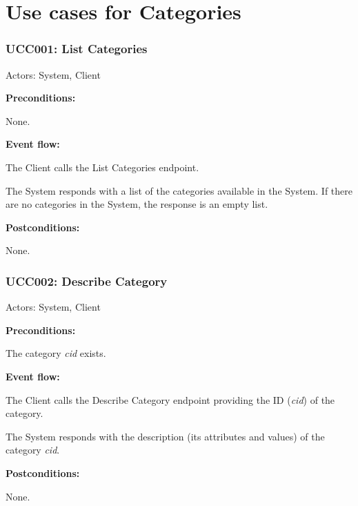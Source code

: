 \section{Use cases for Categories}

\begin{ucbox}{\subsubsection{UCC001: List Categories}}
\label{UCC001}

Actors: System, Client

\textbf{Preconditions:}

\ucitem None.

\textbf{Event flow:}

\ucitem The Client calls the List Categories endpoint.

\ucitem The System responds with a list of the categories available in the System. If there are no categories in the System, the response is an empty list.

\textbf{Postconditions:}

\ucitem None.

\end{ucbox}

\begin{ucbox}{\subsubsection{UCC002: Describe Category}}
\label{UCC002}

Actors: System, Client

\textbf{Preconditions:}

\ucitem The category \textit{cid} exists.

\textbf{Event flow:}

\ucitem The Client calls the Describe Category endpoint providing the ID (\textit{cid}) of the category.

\ucitem The System responds with the description (its attributes and values) of the category \textit{cid}.

\textbf{Postconditions:}

\ucitem None.

\end{ucbox}

